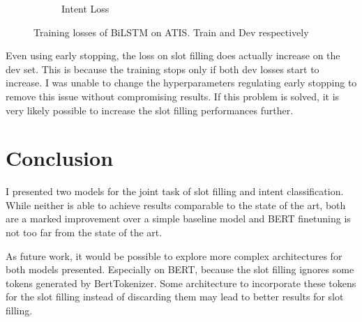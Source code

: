 \documentclass[a4paper]{article}
\begin{document}
\begin{figure}[h!]
\begin{subfigure}[b]{0.22\textwidth}
				\caption{Intent Loss}
	\end{subfigure}
 \caption{Training losses of BiLSTM on ATIS. \textcolor{Myblue}{Train} and \textcolor{Myorange}{Dev} respectively}
 \label{fig:losses}
\end{figure}

Even using early stopping, the loss on slot filling does actually increase on the dev set. This is because the training stops only if both dev losses start to increase. I was unable to change the hyperparameters regulating early stopping to remove this issue without compromising results. If this problem is solved, it is very likely possible to increase the slot filling performances further.
\section{Conclusion}

I presented two models for the joint task of slot filling and intent classification. While neither is able to achieve results comparable to the state of the art, both are a marked improvement over a simple baseline model and BERT finetuning is not too far from the state of the art.

As future work, it would be possible to explore more complex architectures for both models presented. 
Especially on BERT, because the slot filling ignores some tokens generated by BertTokenizer. Some architecture to incorporate these tokens for the slot filling instead of discarding them may lead to better results for slot filling.




%
%
\end{document}
